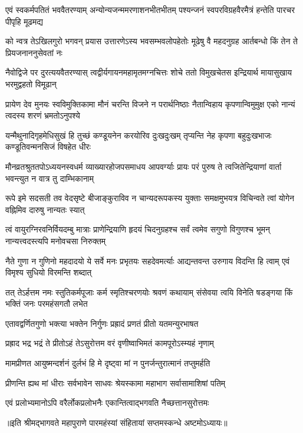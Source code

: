 \fourlineindentedshloka
{एवं स्वकर्मपतितं भववैतरण्याम्}
{अन्योन्यजन्ममरणाशनभीतभीतम्}
{पश्यन्जनं स्वपरविग्रहवैरमैत्रं}
{हन्तेति पारचर पीपृहि मूढमद्य} %

\fourlineindentedshloka
{को न्वत्र तेऽखिलगुरो भगवन् प्रयास}
{उत्तारणेऽस्य भवसम्भवलोपहेतोः}
{मूढेषु वै महदनुग्रह आर्तबन्धो}
{किं तेन ते प्रियजनाननुसेवतां नः} %

\fourlineindentedshloka
{नैवोद्विजे पर दुरत्ययवैतरण्यास्}
{त्वद्वीर्यगायनमहामृतमग्नचित्तः}
{शोचे ततो विमुखचेतस इन्द्रियार्थ}
{मायासुखाय भरमुद्वहतो विमूढान्} %

\fourlineindentedshloka
{प्रायेण देव मुनयः स्वविमुक्तिकामा}
{मौनं चरन्ति विजने न परार्थनिष्ठाः}
{नैतान्विहाय कृपणान्विमुमुक्ष एको}
{नान्यं त्वदस्य शरणं भ्रमतोऽनुपश्ये} %

\fourlineindentedshloka
{यन्मैथुनादिगृहमेधिसुखं हि तुच्छं}
{कण्डूयनेन करयोरिव दुःखदुःखम्}
{तृप्यन्ति नेह कृपणा बहुदुःखभाजः}
{कण्डूतिवन्मनसिजं विषहेत धीरः} %

\fourlineindentedshloka
{मौनव्रतश्रुततपोऽध्ययनस्वधर्म}
{व्याख्यारहोजपसमाधय आपवर्ग्याः}
{प्रायः परं पुरुष ते त्वजितेन्द्रियाणां}
{वार्ता भवन्त्युत न वात्र तु दाम्भिकानाम्} %

\fourlineindentedshloka
{रूपे इमे सदसती तव वेदसृष्टे}
{बीजाङ्कुराविव न चान्यदरूपकस्य}
{युक्ताः समक्षमुभयत्र विचिन्वते त्वां}
{योगेन वह्निमिव दारुषु नान्यतः स्यात्} %

\fourlineindentedshloka
{त्वं वायुरग्निरवनिर्वियदम्बु मात्राः}
{प्राणेन्द्रियाणि हृदयं चिदनुग्रहश्च}
{सर्वं त्वमेव सगुणो विगुणश्च भूमन्}
{नान्यत्त्वदस्त्यपि मनोवचसा निरुक्तम्} %

\fourlineindentedshloka
{नैते गुणा न गुणिनो महदादयो ये}
{सर्वे मनः प्रभृतयः सहदेवमर्त्याः}
{आद्यन्तवन्त उरुगाय विदन्ति हि त्वाम्}
{एवं विमृश्य सुधियो विरमन्ति शब्दात्} %

\fourlineindentedshloka
{तत् तेऽर्हत्तम नमः स्तुतिकर्मपूजाः}
{कर्म स्मृतिश्चरणयोः श्रवणं कथायाम्}
{संसेवया त्वयि विनेति षडङ्गया किं}
{भक्तिं जनः परमहंसगतौ लभेत} %



\twolineshloka
{एतावद्वर्णितगुणो भक्त्या भक्तेन निर्गुणः}
{प्रह्रादं प्रणतं प्रीतो यतमन्युरभाषत} %



\twolineshloka
{प्रह्राद भद्र भद्रं ते प्रीतोऽहं तेऽसुरोत्तम}
{वरं वृणीष्वाभिमतं कामपूरोऽस्म्यहं नृणाम्} %

\twolineshloka
{मामप्रीणत आयुष्मन्दर्शनं दुर्लभं हि मे}
{दृष्ट्वा मां न पुनर्जन्तुरात्मानं तप्तुमर्हति} %

\twolineshloka
{प्रीणन्ति ह्यथ मां धीराः सर्वभावेन साधवः}
{श्रेयस्कामा महाभाग सर्वासामाशिषां पतिम्} %


\twolineshloka
{एवं प्रलोभ्यमानोऽपि वरैर्लोकप्रलोभनैः}
{एकान्तित्वाद्भगवति नैच्छत्तानसुरोत्तमः} %

॥इति श्रीमद्भागवते महापुराणे पारमहंस्यां संहितायां सप्तमस्कन्धे अष्टमोऽध्यायः॥

